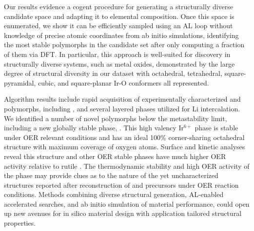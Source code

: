 


%
Our results evidence a cogent procedure for generating a structurally diverse candidate space and adapting it to elemental composition.
%
Once this space is enumerated, we show it can be efficiently sampled using an AL loop without knowledge of precise atomic coordinates from ab initio simulations, identifying the most stable polymorphs in the candidate set after only computing a fraction of them via DFT.
%
In particular, this approach is well-suited for discovery in structurally diverse systems, such as metal oxides, demonstrated by the large degree of structural diversity in our dataset with octahedral, tetrahedral,  square-pyramidal,  cubic,  and  square-planar Ir-O conformers all represented.


%
%
Algorithm results include rapid acquisition of experimentally characterized \IrOtwo and \IrOthree polymorphs, including \rIrOtwo, and several layered \IrOthree phases utilized for Li intercalation.
%
We identified a number of novel \IrOthree polymorphs below the metastability limit, including a new globally stable phase, \aIrOthree.
%
This high valency Ir$^{6+}$ phase is stable under OER relevant conditions and has an ideal 100\% corner-sharing octahedral structure with maximum coverage of oxygen atoms.
%
Surface and kinetic analyses reveal this structure and other OER stable \IrOthree phases have much higher OER activity relative to rutile \IrOtwo.
%
The thermodynamic stability and high OER activity of the \aIrOthree phase may provide clues as to the nature of the yet uncharacterized structures reported after reconstruction of  and \IrOx precursors under OER reaction conditions.
%
Methods combining diverse structural generation, AL-enabled accelerated searches, and ab initio simulation of material performance, could open up new avenues for in silico material design with application tailored structural properties.







